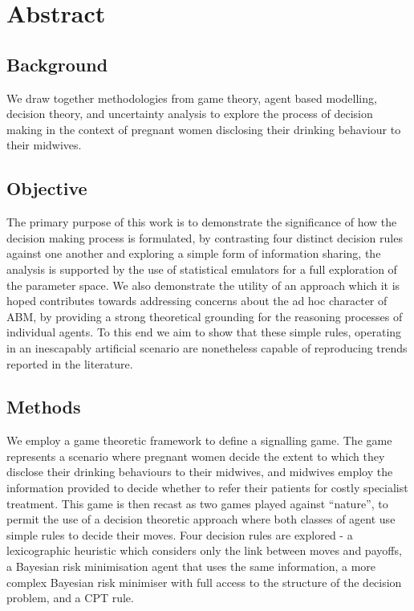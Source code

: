 \begingroup
\let\clearpage\relax
\let\cleardoublepage\relax


\section*{Abstract}

\subsection*{Background}

We draw together methodologies from game theory, agent based modelling, decision theory, and uncertainty analysis to explore the process of decision making in the context of pregnant women disclosing their drinking behaviour to their midwives.

\subsection*{Objective} 

The primary purpose of this work is to demonstrate the significance of how the decision making process is formulated, by contrasting four distinct decision rules against one another and exploring a simple form of information sharing, the analysis is supported by the use of statistical emulators for a full exploration of the parameter space.
We also demonstrate the utility of an approach which it is hoped contributes towards addressing concerns about the ad hoc character of \ac{ABM}, by providing a strong theoretical grounding for the reasoning processes of individual agents. To this end we aim to show that these simple rules, operating in an inescapably artificial scenario are nonetheless capable of reproducing trends reported in the literature.

\subsection*{Methods} 

We employ a game theoretic framework to define a signalling game. The game represents a scenario where pregnant women decide the extent to which they disclose their drinking behaviours to their midwives, and midwives employ the information provided to decide whether to refer their patients for costly specialist treatment. This game is then recast as two games played against \enquote{nature}, to permit the use of a decision theoretic approach where both classes of agent use simple rules to decide their moves.
Four decision rules are explored - a lexicographic heuristic which considers only the link between moves and payoffs, a Bayesian risk minimisation agent that uses the same information, a more complex Bayesian risk minimiser with full access to the structure of the decision problem, and a \ac{CPT} rule.

